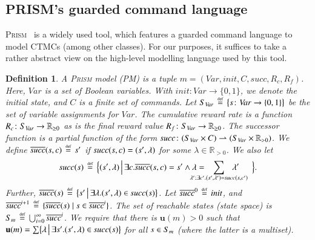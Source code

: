 \documentclass[10pt,twocolumn]{article}
\newtheorem{definition}{Definition}
\newcommand{\PRISM}{\textsc{Prism}\xspace}
\newcommand{\states} {{\ensuremath S}}
\newcommand{\state}  {{\ensuremath s}}
\newcommand{\reals}  {{\ensuremath {\mathbb{R}}}}
\newcommand{\urate}{\mathbf{u}}
\newcommand{\prismModel}{m}
\newcommand{\prismVars}{\mathit{Var}}
\newcommand{\prismInit}{\mathit{init}}
\newcommand{\prismSucc}{\mathit{succ}}
\newcommand{\prismNSucc}{\overline{\prismSucc}}
\newcommand{\prismCmds}{C}
\newcommand{\prismCmd}{c}
\newcommand{\prismCRew}{R_c}
\newcommand{\prismFRew}{R_f}
\newcommand{\defeq}{\,\stackrel{\mbox{\rm {\tiny def}}}{=}\,}
\newcommand{\partialto}{\rightharpoonup}
\begin{document}
\subsection{PRISM's guarded command language}
\label{subsec:prism_gcl}

\noindent\PRISM~\cite{KNP11} is a widely used tool, which features a guarded command language to model CTMCs (among other classes).
For our purposes, it suffices to take a rather abstract view on the high-level modelling language used by this tool.
\begin{definition}
\label{def:prism-model}
  A \emph{\PRISM model (PM)} is a tuple $\prismModel = (\prismVars, \prismInit, \prismCmds, \prismSucc, \prismCRew, \prismFRew)$.
  Here, $\prismVars$ is a set of Boolean \emph{variables}. With $\prismInit\colon \prismVars \to \{0,1\}$,
  we denote the \emph{initial state}, and $\prismCmds$ is a finite set of \emph{commands}.
  Let $\states_{\prismVars} \defeq \bigl\{s\colon\prismVars \to \{0, 1\}\bigr\}$ be the set of variable assignments for $\prismVars$.
  The \emph{cumulative reward rate} is a function $\prismCRew\colon \states_{\prismVars} \to \reals_{\geq 0}$ as is the \emph{final reward value} $\prismFRew\colon \states_{\prismVars} \to \reals_{\geq 0}$.
  The \emph{successor function} is a partial function of the form $\prismSucc\colon (\states_{\prismVars} \times \prismCmds) \partialto (\states_{\prismVars} \times \reals_{> 0})$.
  We define $\prismNSucc(\state, \prismCmd) \defeq \state'$ if $\prismSucc(\state, \prismCmd) = (\state', \lambda)$ for some $\lambda \in \reals_{> 0}$.
  We also let
\begin{equation*}
  \prismSucc(\state) \defeq \Bigl\{(\state', \lambda) \,\Big|\,\exists \prismCmd . \prismNSucc(\state, \prismCmd) = \state' 
  \wedge \lambda = \hspace*{-2em} \sum_{\lambda'; \exists \prismCmd' . (\state', \lambda') = \prismSucc(\state, \prismCmd')}\hspace*{-2em}\lambda'\hspace*{1.5em} \Bigr\}.
\end{equation*}
Further, $\prismNSucc(\state) \defeq \bigl\{\state' \,\big|\, \exists \lambda . (\state', \lambda) \in \prismSucc(\state) \bigr\}$.
  Let $\prismNSucc^0 \defeq \prismInit$, and $\prismNSucc^{i+1} \defeq \{\prismNSucc(\state) \mid \state \in \prismNSucc^{i}\}$.
  The set of \emph{reachable states (state space)} is $\states_{\prismModel} \defeq \bigcup_{i=0}^\infty \prismNSucc^{i}$.
  We require that there is $\urate(\prismModel) > 0$ such that $\urate(\prismModel) = \sum \bigl\{ \lambda \,\big|\, \exists \state' . (\state',\lambda) \in \prismSucc(\state) \bigr\}$ for all $\state \in \states_\prismModel$ (where the latter is a multiset).
\end{definition}
\end{document}
